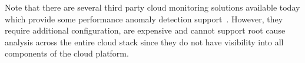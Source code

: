 

Note that there are several
third party cloud monitoring solutions available today which provide some performance
anomaly detection support~\cite{newrelic,datadog,dynatrace}. 
However, they require additional configuration, are expensive
and cannot support root cause analysis across the entire cloud stack since they do not
have visibility into all components of the cloud
platform.
